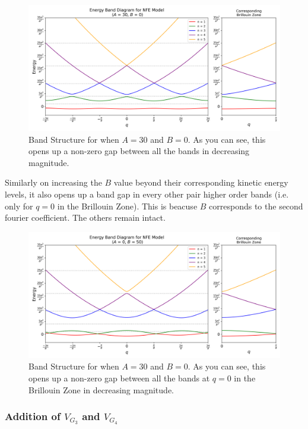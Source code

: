 \documentclass[12pt,a4paper]{article}
\begin{document}
\begin{figure}[H]
    \centering
    \includegraphics[width=1\linewidth]{images/h1.png}
    \caption{Band Structure for when $A=30$ and $B=0$. As you can see, this opens up a non-zero gap between all the bands in decreasing magnitude.}
    \label{h1}
\end{figure}

Similarly on increasing the $B$ value beyond their corresponding kinetic energy levels, it also opens up a band gap in every other pair higher order bands (i.e. only for $q=0$ in the Brillouin Zone). This is beacuse $B$ corresponds to the second fourier coefficient. The others remain intact.

\begin{figure}[H]
    \centering
    \includegraphics[width=1\linewidth]{images/h2.png}
    \caption{Band Structure for when $A=30$ and $B=0$. As you can see, this opens up a non-zero gap between all the bands at $q=0$ in the Brillouin Zone in decreasing magnitude.}
    \label{h2}
\end{figure}

\subsubsection{Addition of $V_{G_3}$ and $V_{G_4}$}
\end{document}
